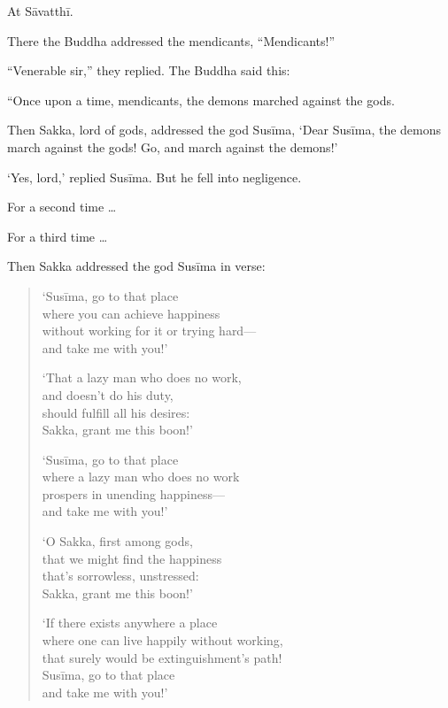 \documentclass[12pt,openany]{book}%
\begin{document}
At \textsanskrit{Sāvatthī}. 

There the Buddha addressed the mendicants, “Mendicants!” 

“Venerable sir,” they replied. The Buddha said this: 

“Once upon a time, mendicants, the demons marched against the gods. 

Then Sakka, lord of gods, addressed the god \textsanskrit{Susīma}, ‘Dear \textsanskrit{Susīma}, the demons march against the gods! Go, and march against the demons!’ 

‘Yes, lord,’ replied \textsanskrit{Susīma}. But he fell into negligence. 

For a second time … 

For a third time … 

Then Sakka addressed the god \textsanskrit{Susīma} in verse: 

\begin{verse}%
‘\textsanskrit{Susīma}, go to that place \\
where you can achieve happiness \\
without working for it or trying hard—\\
and take me with you!’ 

‘That a lazy man who does no work, \\
and doesn’t do his duty, \\
should fulfill all his desires: \\
Sakka, grant me this boon!’ 

‘\textsanskrit{Susīma}, go to that place \\
where a lazy man who does no work \\
prospers in unending happiness—\\
and take me with you!’ 

‘O Sakka, first among gods, \\
that we might find the happiness \\
that’s sorrowless, unstressed: \\
Sakka, grant me this boon!’ 

‘If there exists anywhere a place \\
where one can live happily without working, \\
that surely would be extinguishment’s path! \\
\textsanskrit{Susīma}, go to that place \\
and take me with you!’ 

%
\end{verse}
\end{document}
